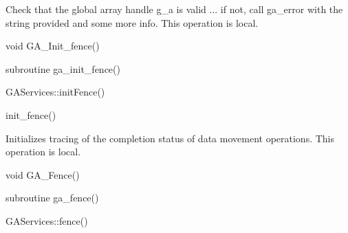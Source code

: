 \documentclass[12pt]{article}
\begin{document}
\begin{desc}

Check that the global array handle g_a is valid ... if not, call 
ga_error with the string provided and some more info.
This operation is local.
\end{desc}


\begin{capi}
\begin{ccode}
void GA_Init_fence()
\end{ccode}
\end{capi}

\begin{fapi}
\begin{fcode}
subroutine ga_init_fence()
\end{fcode}
\end{fapi}

\begin{cxxapi}
\begin{cxxcode}
GAServices::initFence()
\end{cxxcode}
\end{cxxapi}

\begin{pyapi}
\begin{pycode}
init_fence() 
\end{pycode}
\end{pyapi} 


\begin{desc}

Initializes tracing of the completion status of data movement operations.
This operation is local.
\end{desc}


\begin{capi}
\begin{ccode}
void GA_Fence()
\end{ccode}
\end{capi}

\begin{fapi}
\begin{fcode}
subroutine ga_fence()
\end{fcode}
\end{fapi}

\begin{cxxapi}
\begin{cxxcode}
GAServices::fence()
\end{cxxcode}
\end{cxxapi}
\end{document}
